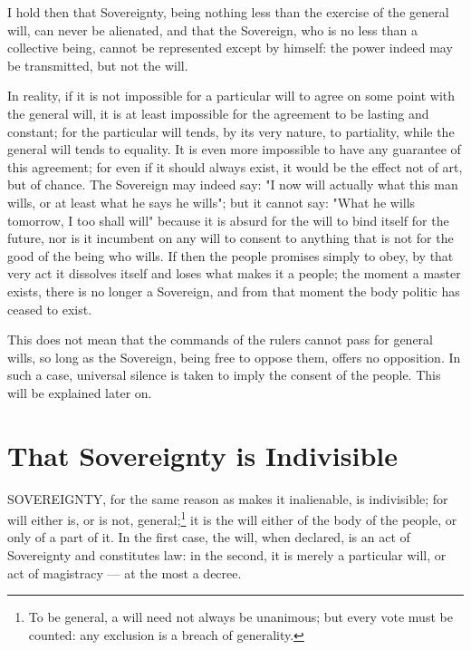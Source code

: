 \documentclass[12pt]{report}
\begin{document}
I hold then that Sovereignty, being nothing less than the exercise of the general will, can never be alienated, and that the Sovereign, who is no less than a collective being, cannot be represented except by himself: the power indeed may be transmitted, but not the will.

In reality, if it is not impossible for a particular will to agree on some point with the general will, it is at least impossible for the agreement to be lasting and constant; for the particular will tends, by its very nature, to partiality, while the general will tends to equality. It is even more impossible to have any guarantee of this agreement; for even if it should always exist, it would be the effect not of art, but of chance. The Sovereign may indeed say: "I now will actually what this man wills, or at least what he says he wills"; but it cannot say: "What he wills tomorrow, I too shall will" because it is absurd for the will to bind itself for the future, nor is it incumbent on any will to consent to anything that is not for the good of the being who wills. If then the people promises simply to obey, by that very act it dissolves itself and loses what makes it a people; the moment a master exists, there is no longer a Sovereign, and from that moment the body politic has ceased to exist.

This does not mean that the commands of the rulers cannot pass for general wills, so long as the Sovereign, being free to oppose them, offers no opposition. In such a case, universal silence is taken to imply the consent of the people. This will be explained later on.

\section{That Sovereignty is Indivisible}
SOVEREIGNTY, for the same reason as makes it inalienable, is indivisible; for will either is, or is not, general;\footnote{To be general, a will need not always be unanimous; but every vote must be counted: any exclusion is a breach of generality.} it is the will either of the body of the people, or only of a part of it. In the first case, the will, when declared, is an act of Sovereignty and constitutes law: in the second, it is merely a particular will, or act of magistracy — at the most a decree.
\end{document}
